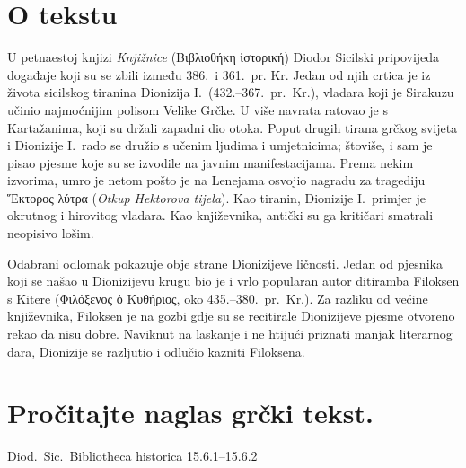 


\section*{O tekstu}

U petnaestoj knjizi \textit{Knjižnice} \textgreek[variant=ancient]{(Βιβλιοθήκη ἱστορική)} Diodor Sicilski pripovijeda događaje koji su se zbili između 386.\ i 361.\ pr. Kr. Jedan od njih crtica je iz života sicilskog tiranina Dionizija I.\ (432.–367.\ pr.~Kr.), vladara koji je Sirakuzu učinio najmoćnijim polisom Velike Grčke. U više navrata ratovao je s Kartažanima, koji su držali zapadni dio otoka. Poput drugih tirana grčkog svijeta i Dionizije I.\ rado se družio s učenim ljudima i umjetnicima; štoviše, i sam je pisao pjesme koje su se izvodile na javnim manifestacijama. Prema nekim izvorima, umro je netom pošto je na Lenejama osvojio nagradu za tragediju \textgreek[variant=ancient]{Ἕκτορος λύτρα} (\textit{Otkup Hektorova tijela}). Kao tiranin, Dionizije I.\ primjer je okrutnog i hirovitog vladara. Kao književnika, antički su ga kritičari smatrali neopisivo lošim.
 
Odabrani odlomak pokazuje obje strane Dionizijeve ličnosti. Jedan od pjesnika koji se našao u Dionizijevu krugu bio je i vrlo popularan autor ditiramba Filoksen s Kitere (\textgreek[variant=ancient]{Φιλόξενος ὁ Κυθήριος,} oko 435.–380.\ pr.~Kr.). Za razliku od većine književnika, Filoksen je na gozbi gdje su se recitirale Dionizijeve pjesme otvoreno rekao da nisu dobre. Naviknut na laskanje i ne htijući priznati manjak literarnog dara, Dionizije se razljutio i odlučio kazniti Filoksena.

\newpage

\section*{Pročitajte naglas grčki tekst.}

Diod.~Sic.\ Bibliotheca historica 15.6.1–15.6.2


\medskip


